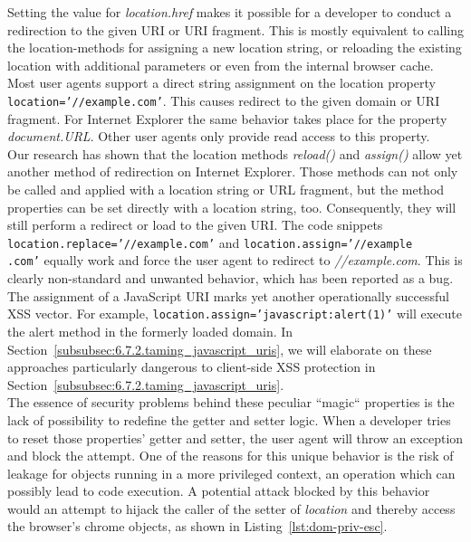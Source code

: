    Setting the value for \textit{location.href} makes it possible for a developer to conduct a redirection to the given URI or URI fragment. This is mostly equivalent to calling the location-methods for assigning a new location string, or reloading the existing location with additional parameters or even from the internal browser cache. Most user agents support a direct string assignment on the location property  \texttt{location='//example.com'}. This causes redirect to the given domain or URI fragment. For Internet Explorer the same behavior takes place for the property \textit{document.URL}. Other user agents only provide read access to this property. \\

    Our research has shown that the location methods \textit{reload()} and \textit{assign()} allow yet another method of redirection on Internet Explorer. Those methods can not only be called and applied with a location string or URL fragment, but the method properties can be set directly with a location string, too. Consequently, they will still perform a redirect or load to the given URI. The code snippets \texttt{location.replace='//example.com'} and \texttt{location.assign='//example\\
.com'} equally work and force the user agent to redirect to \textit{//example.com}. This is clearly non-standard and unwanted behavior, which has been reported as a bug. The assignment of a JavaScript URI marks yet another operationally successful XSS vector. For example, \texttt{location.assign='javascript:alert(1)'} will execute the alert method in the formerly loaded domain. In Section~\ref{subsubsec:6.7.2.taming_javascript_uris}, we will elaborate on these approaches particularly dangerous to client-side XSS protection in Section~\ref{subsubsec:6.7.2.taming_javascript_uris}. \\

    The essence of security problems behind these peculiar ``magic`` properties is the lack of possibility to redefine the getter and setter logic. When a developer tries to reset those properties' getter and setter, the user agent will throw an exception and block the attempt. One of the reasons for this unique behavior is the risk of leakage for objects running in a more privileged context, an operation which can possibly lead to code execution. A potential attack blocked by this behavior would an attempt to hijack the caller of the setter of \textit{location} and thereby access the browser's chrome objects, as shown in Listing~\ref{lst:dom-priv-esc}.

